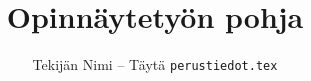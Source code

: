 \newcommand{\theauthor}{
  Tekijän Nimi -- Täytä \texttt{perustiedot.tex}
}

\newcommand{\thetitle}{
  Opinnäytetyön pohja
}

\newcommand{\thesubtitle}{
  Alaotsikko
}

\newcommand{\reporttype}{
  Raportin tyyppi (Opinnäytetyö?)
}

\newcommand{\schoolfi}{
  Koulutusala suomeksi
}

\newcommand{\schooluk}{
  Koulutusala englanniksi
}

\newcommand{\degreefi}{
  Tutkinto suomeksi
}

\newcommand{\degreeuk}{
  Tutkinto englanniksi
}

\newcommand{\publishdate}{
  \today
} %

\newcommand{\totalappendix}{
  Täytä liitteiden lukumäärä tänne
}


\author{\theauthor}
\title{\thetitle}
\newcommand{\totalpages}{\pageref{LastPage}}

